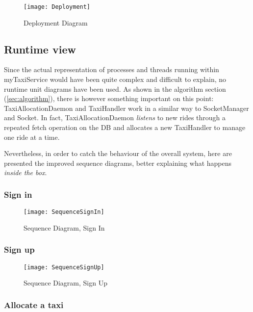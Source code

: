 \begin{figure}[h!]
    \centering
    \texttt{[image: Deployment]}
    \caption{Deployment Diagram}
    \label{fig:deploy}
\end{figure}

\pagebreak

\subsection{Runtime view}
Since the actual representation of processes and threads running within myTaxiService would have been quite complex and difficult to explain, no runtime unit diagrams have been used. As shown in the algorithm section (\ref{sec:algorithm}), there is however something important on this point: TaxiAllocationDaemon and TaxiHandler work in a similar way to SocketManager and Socket. In fact, TaxiAllocationDaemon \emph{listens} to new rides through a repeated fetch operation on the DB and allocates a new TaxiHandler to manage one ride at a time.

Nevertheless, in order to catch the behaviour of the overall system, here are presented the improved sequence diagrams, better explaining what happens \emph{inside the box}.

\subsubsection{Sign in} %
\label{ssec:signin}
\begin{figure}[H]
    \centering
    \texttt{[image: SequenceSignIn]}
    \caption{Sequence Diagram, Sign In}
    \label{fig:signin}
\end{figure}

\subsubsection{Sign up} %
\label{ssec:signup}

\begin{figure}[H]
    \centering
    \texttt{[image: SequenceSignUp]}
    \caption{Sequence Diagram, Sign Up}
    \label{fig:signup}
\end{figure}

\subsubsection{Allocate a taxi} %
\label{ssec:allocate}

